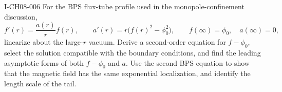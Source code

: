 \begin{exercise}{I-CH08-006}
For the BPS flux-tube profile used in the monopole-confinement discussion,
\[
 f'(r)=\frac{a(r)}r f(r),\qquad
 a'(r)=r\bigl(f(r)^2-\phi_0^2\bigr),\qquad
 f(\infty)=\phi_0,\quad a(\infty)=0,
\]
linearize about the large-$r$ vacuum.  Derive a second-order equation for
$f-\phi_0$, select the solution compatible with the boundary conditions,
and find the leading asymptotic forms of both $f-\phi_0$ and $a$.  Use the
second BPS equation to show that the magnetic field has the same exponential
localization, and identify the length scale of the tail.
\end{exercise}
